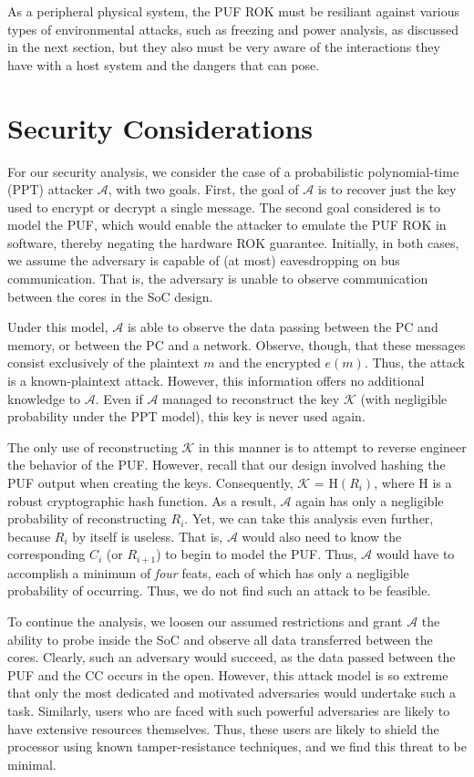 As a peripheral physical system, the PUF ROK must be resiliant against various types of environmental attacks, such
as freezing and power analysis, as discussed in the next section, but they also must be very aware of the
interactions they have with a host system and the dangers that can pose.

\section{Security Considerations}
For our security analysis, we consider the case of a probabilistic polynomial-time (PPT) attacker $\mathcal{A}$,
with two goals.  First, the goal of $\mathcal{A}$ is to recover just the key used to encrypt or decrypt a
single message.  The second goal considered is to model the PUF, which would enable the attacker to emulate
the PUF ROK in software, thereby negating the hardware ROK guarantee.  Initially, in both cases, we assume
the adversary is capable of (at most) eavesdropping on bus communication.  That is, the adversary is unable
to observe communication between the cores in the SoC design.

Under this model, $\mathcal{A}$ is able to observe the data passing between the PC and memory, or between
the PC and a network.  Observe, though, that these messages consist exclusively of the plaintext $m$ and the
encrypted $e(m)$.  Thus, the attack is a known-plaintext attack.  However, this information offers no
additional knowledge to $\mathcal{A}$.  Even if $\mathcal{A}$ managed to reconstruct the key $\mathcal{K}$
(with negligible probability under the PPT model), this key is never used again.

The only use of reconstructing $\mathcal{K}$ in this manner is to attempt to reverse engineer
the behavior of the PUF.  However, recall that our design involved hashing the PUF output when
creating the keys.  Consequently, $\mathcal{K}$ = {\sf H}$(R_i)$, where {\sf H} is a robust cryptographic
hash function.  As a result, $\mathcal{A}$ again has only a negligible probability of reconstructing $R_i$.
Yet, we can take this analysis even further, because $R_i$ by itself is useless.  That is, $\mathcal{A}$
would also need to know the corresponding $C_i$ (or $R_{i+1}$) to begin to model the PUF.  Thus, $\mathcal{A}$
would have to accomplish a minimum of \emph{four} feats, each of which has only a negligible probability of
occurring.  Thus, we do not find such an attack to be feasible.

To continue the analysis, we loosen our assumed restrictions and grant $\mathcal{A}$ the ability to probe
inside the SoC and observe all data transferred between the cores.  Clearly, such an adversary would
succeed, as the data passed between the PUF and the CC occurs in the open.  However, this attack model
is so extreme that only the most dedicated and motivated adversaries would undertake such a task.
Similarly, users who are faced with such powerful adversaries are likely to have extensive resources 
themselves.  Thus, these users are likely to shield the processor using known tamper-resistance
techniques, and we find this threat to be minimal.

